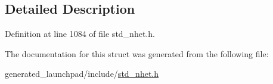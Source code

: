 \subsection{Detailed Description}


Definition at line 1084 of file std\+\_\+nhet.\+h.



The documentation for this struct was generated from the following file\+:\begin{DoxyCompactItemize}
\item 
generated\+\_\+launchpad/include/\mbox{\hyperlink{std__nhet_8h}{std\+\_\+nhet.\+h}}\end{DoxyCompactItemize}
